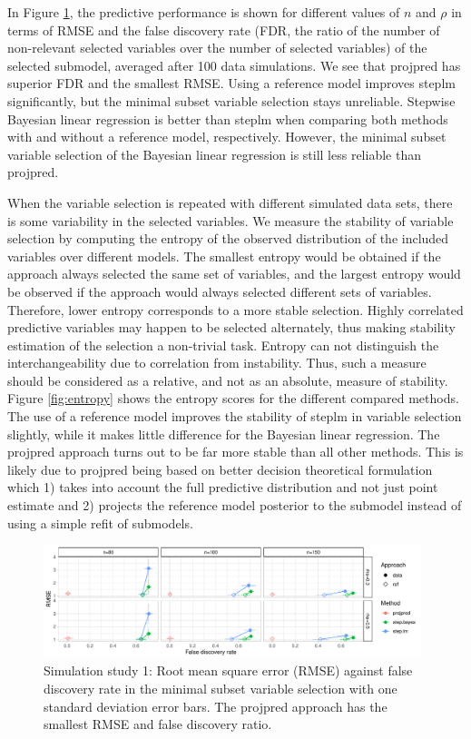 \documentclass[a4]{article}
\theoremstyle{definition}
\begin{document}
In Figure \ref{fig:rmse_vs_fdr}, the predictive performance is shown
for different values of $n$ and $\rho$ in terms of RMSE and the false discovery rate (FDR, the ratio of the number of non-relevant selected
variables over the number of selected variables) of the selected submodel,
averaged after 100 data simulations. We see that projpred has superior FDR and the
smallest RMSE. Using a reference model improves steplm significantly,
but the minimal subset variable selection stays unreliable. Stepwise
Bayesian linear regression is better than steplm when comparing both methods with
and without a reference model, respectively. However, the minimal subset variable
selection of the Bayesian linear regression is still less reliable than projpred.

When the variable selection is repeated with different simulated data
sets, there is some variability in the selected variables. We
measure the stability of variable selection by computing the entropy
of the observed distribution of the included variables over different models. The smallest entropy
would be obtained if the approach always selected the same set of
variables, and the largest entropy would be observed if the approach
would always selected different sets of variables. Therefore, lower entropy 
corresponds to a more stable selection. Highly correlated predictive variables may happen to be
selected alternately, thus making stability estimation of the
selection a non-trivial task. Entropy can not distinguish the interchangeability 
due to correlation from instability. Thus, such a measure should be 
considered as a relative, and not as an absolute, measure of stability.
Figure \ref{fig:entropy} shows the entropy scores for the different compared
methods. The use of a reference model
improves the stability of steplm in variable selection slightly, while it makes
little difference for the Bayesian linear regression. The
projpred approach turns out to be far more stable than all
other methods. This is likely due to projpred being based on better
decision theoretical formulation which 1) takes into account the full
predictive distribution and not just point estimate and 2) projects
the reference model posterior to the submodel instead of using a
simple refit of submodels.

\begin{figure}[tp]
  \centering
  \includegraphics[width=0.98\textwidth]{graphics/rmse_vs_fdr_parallel.pdf}
  \vspace{-0.3\baselineskip}
  \caption{Simulation study 1: Root mean square error (RMSE) against false discovery rate in the minimal subset variable selection with one standard deviation error bars. The projpred approach has the smallest RMSE and false discovery ratio.}
  \label{fig:rmse_vs_fdr}
\end{figure}
\end{document}
